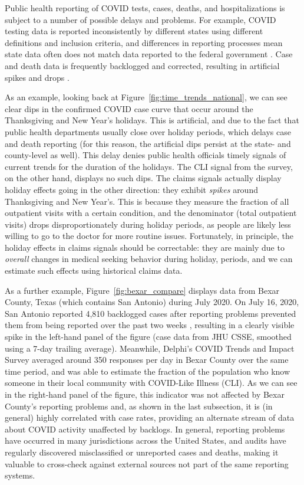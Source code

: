 \documentclass[11pt]{article}
\begin{document}
Public health reporting of COVID tests, cases, deaths, and hospitalizations is
subject to a number of possible delays and problems. For example, COVID testing
data is reported inconsistently by different states using different definitions
and inclusion criteria, and differences in reporting processes mean state data
often does not match data reported to the federal government
\cite{Schechtman:2021}. Case and death data is frequently backlogged and
corrected, resulting in artificial spikes and drops \cite{Simon:2021,
  ArvisaisAnhalt:2021}.

As an example, looking back at Figure~\ref{fig:time_trends_national}, we can see
clear dips in the confirmed COVID case curve that occur around the Thanksgiving
and New Year's holidays. This is artificial, and due to the fact that public
health departments usually close over holiday periods, which delays case and
death reporting (for this reason, the artificial dips persist at the state- and
county-level as well). This delay denies public health officials timely signals
of current trends for the duration of the holidays. The CLI signal from the
survey, on the other hand, displays no such dips. The claims signals actually
display holiday effects going in the other direction: they exhibit
\textit{spikes} around Thanksgiving and New Year's. This is because they measure
the fraction of all outpatient visits with a certain condition, and the
denominator (total outpatient visits) drops disproportionately during holiday
periods, as people are likely less willing to go to the doctor for more routine
issues. Fortunately, in principle, the holiday effects in claims signals should
be correctable: they are mainly due to \textit{overall} changes in medical
seeking behavior during holiday, periods, and we can estimate such effects using
historical claims data.

As a further example, Figure~\ref{fig:bexar_compare} displays data from Bexar
County, Texas (which contains San Antonio) during July 2020. On July 16, 2020,
San Antonio reported 4,810 backlogged cases after reporting problems prevented
them from being reported over the past two weeks \cite{Palacios:2021}, resulting
in a clearly visible spike in the left-hand panel of the figure (case data from
JHU CSSE, smoothed using a 7-day trailing average). Meanwhile, Delphi's COVID
Trends and Impact Survey averaged around 350 responses per day in Bexar County
over the same time period, and was able to estimate the fraction of the
population who know someone in their local community with COVID-Like Illness
(CLI). As we can see in the right-hand panel of the figure, this indicator was
not affected by Bexar County's reporting problems and, as shown in the last
subsection, it is (in general) highly correlated with case rates, providing an
alternate stream of data about COVID activity unaffected by backlogs. In
general, reporting problems have occurred in many jurisdictions across the
United States, and audits have regularly discovered misclassified or unreported
cases and deaths, making it valuable to cross-check against external sources not
part of the same reporting systems.
\end{document}
